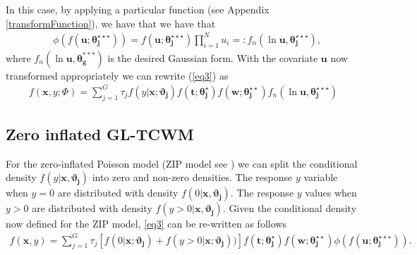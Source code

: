 \documentclass[11pt,letterpaper]{article}
\numberwithin{equation}{section}
\numberwithin{equation}{section}
\numberwithin{equation}{section}
\begin{document}

In this case, by applying a particular function (see Appendix  \ref{transformFunction}), we have that we have that  \begin{align} & \phi (f(\bm{u};\bm{\theta_j^{\star\star\star}})) = f(\bm{u};\bm{\theta_j^{\star\star\star}})  \prod_{i=1}^{N}u_{i} =: f_{n}(\ln \bm{u},\bm{\theta_j^{\star\star\star}}) ,
 \label{eq7} 
\end{align}
where $ f_{n}(\ln \bm{u},\bm{\theta_g^{***}}) $ is the desired Gaussian form. With the covariate $\bm{u}$ now transformed appropriately we can rewrite (\ref{eq3}) as
\begin{align} 
 f(\bm x, y; \Phi)= \sum_{j=1}^{G} \tau_j f(y|\bm{x};\bm{\vartheta_j})f(\bm{t};\bm{\theta_j^{\star}})f(\bm{w};\bm{\theta_j^{\star\star}})f_{n}(\ln \bm{u},\bm{\theta_j^{\star\star\star}}) 
\label{eq8}
\end{align}


\subsection{Zero inflated  GL-TCWM}%

For the zero-inflated Poisson model (ZIP model see \citep{Lambert}) we can split the conditional density $f(y|\bm{x},\bm{\vartheta_j})$ into zero and non-zero densities. %
The response $y$ variable when $y= 0$  are distributed with density $f(0|\bm{x},\bm{\vartheta_{j}})$. The response $y$ values when $y > 0$ are distributed with density $f(y > 0|\bm{x}, \bm{\vartheta_{j}} )$. Given the conditional density now defined for the ZIP model, \eqref{eq3}   
can be re-written as follows 
 \begin{align}
 f(\bm x, y)= \sum_{j=1}^{G} \tau_j \left[ f(0|\bm{x};\bm{\vartheta_{j} }) +  f(y > 0|\bm{x} ; \bm{\vartheta_{j}})  ) \right]   f(\bm{t};\bm{\theta_j^{\star}})f(\bm{w};\bm{\theta_j^{\star\star}})\phi(f(\bm{u};\bm{\theta_j^{\star\star\star}})). 
\end{align}
\end{document}
